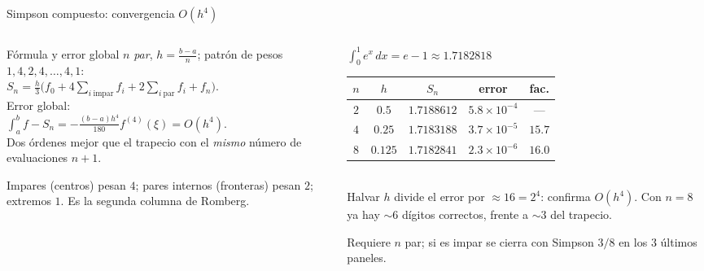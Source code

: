 \documentclass[aspectratio=169,10pt]{beamer}
\begin{document}
\begin{frame}{Simpson compuesto: convergencia $O(h^4)$}
\begin{columns}[T]
\begin{column}{0.49\textwidth}
\begin{cardidea}{Fórmula y error global}{\faSuperscript}
{\footnotesize $n$ \emph{par}, $h=\tfrac{b-a}{n}$; patrón de pesos $1,4,2,4,\dots,4,1$:\\[0.5mm]
$\displaystyle S_n=\frac{h}{3}\Big(f_0+4\!\!\sum_{i\ \text{impar}}\!\!f_i+2\!\!\sum_{i\ \text{par}}\!\!f_i+f_n\Big)$.\\[1.0mm]
Error global:\\[0.2mm]
$\displaystyle\int_a^b f-S_n=-\frac{(b-a)h^4}{180}f^{(4)}(\xi)=O(h^4)$.\\[0.8mm]
Dos órdenes mejor que el trapecio con el \emph{mismo} número de evaluaciones $n+1$.}
\end{cardidea}
\vspace{1mm}
\begin{cardnota}[\faInfoCircle]
{\footnotesize Impares (centros) pesan $4$; pares internos (fronteras) pesan $2$; extremos $1$. Es la segunda columna de Romberg.}
\end{cardnota}
\end{column}
\begin{column}{0.49\textwidth}
\begin{cardgear}{$\int_0^1 e^x\,dx=e-1\approx1.7182818$}{\faTable}
\centering
{\footnotesize\renewcommand{\arraystretch}{1.32}\setlength{\tabcolsep}{6pt}
\begin{tabular}{c|c|c|cc}
$n$ & $h$ & $S_n$ & error & fac.\\\hline
$2$ & $0.5$ & $1.7188612$ & $5.8{\times}10^{-4}$ & —\\
$4$ & $0.25$ & $1.7183188$ & $3.7{\times}10^{-5}$ & $15.7$\\
$8$ & $0.125$ & $1.7182841$ & $2.3{\times}10^{-6}$ & $16.0$\\
\end{tabular}}\\[1.4mm]
{\footnotesize Halvar $h$ divide el error por $\approx16=2^4$: confirma $O(h^4)$. Con $n{=}8$ ya hay $\sim6$ dígitos correctos, frente a $\sim3$ del trapecio.}
\end{cardgear}
\vspace{1mm}
\begin{cardnota}[\faExclamationTriangle]
{\footnotesize Requiere $n$ par; si es impar se cierra con Simpson $3/8$ en los $3$ últimos paneles.}
\end{cardnota}
\end{column}
\end{columns}
\end{frame}
\end{document}
